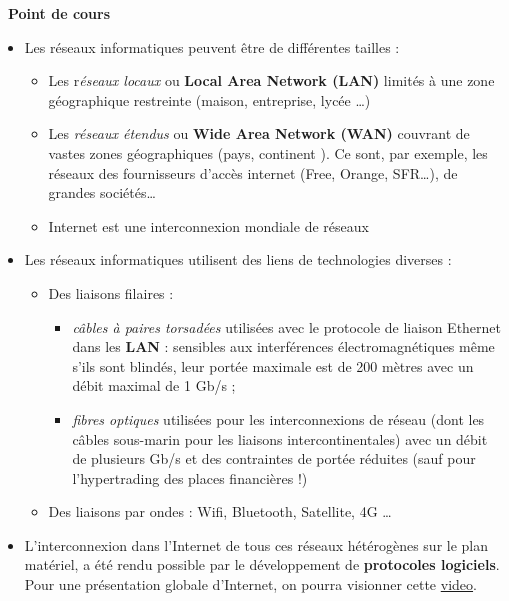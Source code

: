 \documentclass[
  11pt,
]{article}
\providecommand{\tightlist}{%
  \setlength{\itemsep}{0pt}\setlength{\parskip}{0pt}}
\newcounter{cours}
\newenvironment{cours}[1]
{\par \medskip   \addtocounter{cours}{1} \noindent  
\begin{bclogo}[arrondi =0.1,  ombre = true, barre=none, logo=\bcbook, marge=4]{~\textbf{Point de cours} \textbf{\thecours} {\itshape #1} }  \par}
{
\end{bclogo}
 \par \bigskip }
\newcounter{logi}
\begin{document}
\begin{cours}{}

\begin{itemize}
\tightlist
\item
  Les réseaux informatiques peuvent être de différentes tailles :

  \begin{itemize}
  \tightlist
  \item
    Les r\emph{éseaux locaux} ou \textbf{Local Area Network (LAN)}
    limités à une zone géographique restreinte (maison, entreprise,
    lycée \ldots)
  \item
    Les \emph{réseaux étendus} ou \textbf{Wide Area Network (WAN)}
    couvrant de vastes zones géographiques (pays, continent ). Ce sont,
    par exemple, les réseaux des fournisseurs d'accès internet (Free,
    Orange, SFR\ldots), de grandes sociétés\ldots{}
  \item
    Internet est une interconnexion mondiale de réseaux
  \end{itemize}
\item
  Les réseaux informatiques utilisent des liens de technologies diverses
  :

  \begin{itemize}
  \tightlist
  \item
    Des liaisons filaires :

    \begin{itemize}
    \tightlist
    \item
      \emph{câbles à paires torsadées} utilisées avec le protocole de
      liaison Ethernet dans les \textbf{LAN} : sensibles aux
      interférences électromagnétiques même s'ils sont blindés, leur
      portée maximale est de 200 mètres avec un débit maximal de 1 Gb/s
      ;
    \item
      \emph{fibres optiques} utilisées pour les interconnexions de
      réseau (dont les câbles sous-marin pour les liaisons
      intercontinentales) avec un débit de plusieurs Gb/s et des
      contraintes de portée réduites (sauf pour l'hypertrading des
      places financières !)
    \end{itemize}
  \item
    Des liaisons par ondes : Wifi, Bluetooth, Satellite, 4G \ldots{}
  \end{itemize}
\item
  L'interconnexion dans l'Internet de tous ces réseaux hétérogènes sur
  le plan matériel, a été rendu possible par le développement de
  \textbf{protocoles logiciels}. Pour une présentation globale
  d'Internet, on pourra visionner cette
  \href{https://youtu.be/dCknqcjcItU}{video}.
\end{itemize}

\end{cours}
\end{document}

